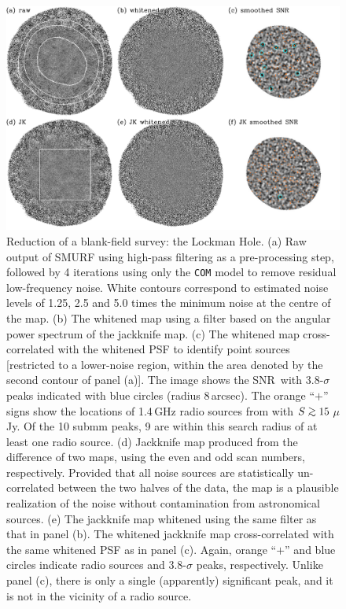 \documentclass[useAMS,usenatbib,nofootinbib]{mn2e}
\newcommand{\snr}{SNR}
\def\gsim{\mathrel{\lower2.5pt\vbox{\lineskip=0pt\baselineskip=0pt
          \hbox{$>$}\hbox{$\sim$}}}}
\newcommand{\model}[1]{\texttt{#1}}
\begin{document}
\begin{figure}
\centering
\includegraphics[width=\linewidth]{lockman_maps.pdf}
\caption{Reduction of a blank-field survey: the Lockman Hole. (a) Raw
  output of SMURF using high-pass filtering as a pre-processing step,
  followed by 4 iterations using only the \model{COM} model to remove
  residual low-frequency noise. White contours correspond to estimated
  noise levels of 1.25, 2.5 and 5.0 times the minimum noise at the
  centre of the map. (b) The whitened map using a filter based on the
  angular power spectrum of the jackknife map. (c) The whitened map
  cross-correlated with the whitened PSF to identify point sources
  [restricted to a lower-noise region, within the area denoted by the
  second contour of panel (a)]. The image shows the \snr\, with
  3.8-$\sigma$ peaks indicated with blue circles (radius
  8\,arcsec). The orange ``$+$'' signs show the locations of 1.4\,GHz
  radio sources from \citet{owen2008} with $S\gsim15$\,$\mu$Jy. Of the
  10 submm peaks, 9 are within this search radius of at least one
  radio source. (d) Jackknife map produced from the difference of two
  maps, using the even and odd scan numbers, respectively. Provided
  that all noise sources are statistically un-correlated between the
  two halves of the data, the map is a plausible realization of the
  noise without contamination from astronomical sources. (e) The
  jackknife map whitened using the same filter as that in panel
  (b). The whitened jackknife map cross-correlated with the same
  whitened PSF as in panel (c). Again, orange ``$+$'' and blue circles
  indicate radio sources and 3.8-$\sigma$ peaks, respectively. Unlike
  panel (c), there is only a single (apparently) significant peak, and
  it is not in the vicinity of a radio source.}
\label{fig:lockman_maps}
\end{figure}
\end{document}
